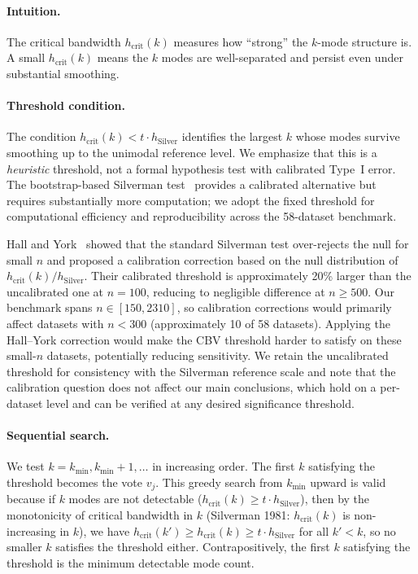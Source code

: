 \documentclass[journal]{IEEEtran}
\begin{document}
\paragraph{Intuition.}
The critical bandwidth $h_{\mathrm{crit}}(k)$ measures how ``strong'' the $k$-mode structure is. A small $h_{\mathrm{crit}}(k)$ means the $k$ modes are well-separated and persist even under substantial smoothing.

\paragraph{Threshold condition.}
The condition $h_{\mathrm{crit}}(k) < t \cdot h_{\mathrm{Silver}}$ identifies the largest $k$ whose modes survive smoothing up to the unimodal reference level. We emphasize that this is a \emph{heuristic} threshold, not a formal hypothesis test with calibrated Type~I error. The bootstrap-based Silverman test~\cite{silverman1981using} provides a calibrated alternative but requires substantially more computation; we adopt the fixed threshold for computational efficiency and reproducibility across the 58-dataset benchmark.

Hall and York~\cite{hall2001calibration} showed that the standard Silverman test over-rejects the null for small $n$ and proposed a calibration correction based on the null distribution of $h_{\mathrm{crit}}(k)/h_{\mathrm{Silver}}$. Their calibrated threshold is approximately 20\% larger than the uncalibrated one at $n=100$, reducing to negligible difference at $n \geq 500$. Our benchmark spans $n \in [150, 2310]$, so calibration corrections would primarily affect datasets with $n < 300$ (approximately 10 of 58 datasets). Applying the Hall--York correction would make the CBV threshold harder to satisfy on these small-$n$ datasets, potentially reducing sensitivity. We retain the uncalibrated threshold for consistency with the Silverman reference scale and note that the calibration question does not affect our main conclusions, which hold on a per-dataset level and can be verified at any desired significance threshold.

\paragraph{Sequential search.}
We test $k = k_{\min}, k_{\min}+1, \ldots$ in increasing order. The first $k$ satisfying the threshold becomes the vote $v_j$. This greedy search from $k_{\min}$ upward is valid because if $k$ modes are not detectable ($h_{\mathrm{crit}}(k) \geq t \cdot h_{\mathrm{Silver}}$), then by the monotonicity of critical bandwidth in $k$ (Silverman 1981: $h_{\mathrm{crit}}(k)$ is non-increasing in $k$), we have $h_{\mathrm{crit}}(k') \geq h_{\mathrm{crit}}(k) \geq t \cdot h_{\mathrm{Silver}}$ for all $k' < k$, so no smaller $k$ satisfies the threshold either. Contrapositively, the first $k$ satisfying the threshold is the minimum detectable mode count.
\end{document}
